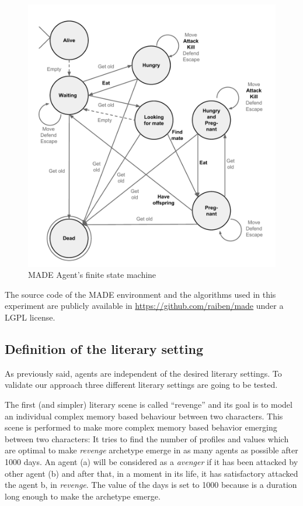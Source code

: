 \documentclass[letterpaper]{article}
\begin{document}
\begin{figure}
\begin{center}
\includegraphics[scale=0.35]{img/fsm.pdf}
\caption{MADE Agent's finite state machine}
\label{fig:fsm}
\end{center}
\end{figure}



The source code of the MADE environment and the algorithms used in this experiment are publicly available in \url{https://github.com/raiben/made} under a LGPL license.

\subsection{Definition of the literary setting}

As previously said, agents are independent of the desired literary settings. To validate our approach three different literary settings are going to be tested.

The first (and simpler) literary scene is called ``revenge'' and its goal is to model an individual complex memory
based behaviour between two characters. This scene is performed to make more complex memory based behavior emerging between two characters:  It tries to find the number of profiles and values which are optimal to make \textit{revenge} archetype emerge in as many agents as possible after 1000 days.  An agent (a) will be considered as a \textit{avenger} if it has been attacked by other agent (b) and after that, in a moment in its life, it has satisfactory attacked the agent b, in \textit{revenge}. The value of the days is set to 1000 because is a duration long enough to make the archetype emerge. 
\end{document}
